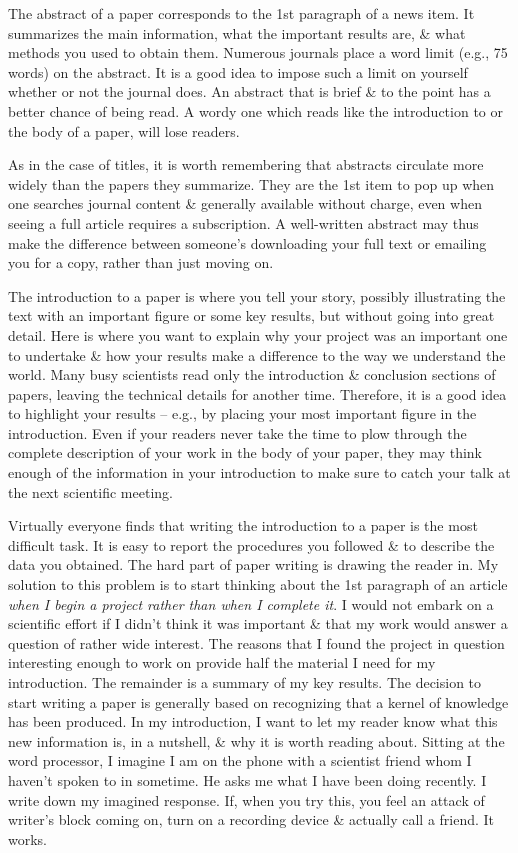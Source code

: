 \documentclass{article}
\begin{document}
\begin{enumerate}
\begin{itemize}
\begin{itemize}
			The abstract of a paper corresponds to the 1st paragraph of a news item. It summarizes the main information, what the important results are, \& what methods you used to obtain them. Numerous journals place a word limit (e.g., 75 words) on the abstract. It is a good idea to impose such a limit on yourself whether or not the journal does. An abstract that is brief \& to the point has a better chance of being read. A wordy one which reads like the introduction to or the body of a paper, will lose readers.
			
			As in the case of titles, it is worth remembering that abstracts circulate more widely than the papers they summarize. They are the 1st item to pop up when one searches journal content \& generally available without charge, even when seeing a full article requires a subscription. A well-written abstract may thus make the difference between someone's downloading your full text or emailing you for a copy, rather than just moving on.
			
			The introduction to a paper is where you tell your story, possibly illustrating the text with an important figure or some key results, but without going into great detail. Here is where you want to explain why your project was an important one to undertake \& how your results make a difference to the way we understand the world. Many busy scientists read only the introduction \& conclusion sections of papers, leaving the technical details for another time. Therefore, it is a good idea to highlight your results -- e.g., by placing your most important figure in the introduction. Even if your readers never take the time to plow through the complete description of your work in the body of your paper, they may think enough of the information in your introduction to make sure to catch your talk at the next scientific meeting.
			
			Virtually everyone finds that writing the introduction to a paper is the most difficult task. It is easy to report the procedures you followed \& to describe the data you obtained. The hard part of paper writing is drawing the reader in. My solution to this problem is to start thinking about the 1st paragraph of an article \textit{when I begin a project rather than when I complete it}. I would not embark on a scientific effort if I didn't think it was important \& that my work would answer a question of rather wide interest. The reasons that I found the project in question interesting enough to work on provide half the material I need for my introduction. The remainder is a summary of my key results. The decision to start writing a paper is generally based on recognizing that a kernel of knowledge has been produced. In my introduction, I want to let my reader know what this new information is, in a nutshell, \& why it is worth reading about. Sitting at the word processor, I imagine I am on the phone with a scientist friend whom I haven't spoken to in sometime. He asks me what I have been doing recently. I write down my imagined response. If, when you try this, you feel an attack of writer's block coming on, turn on a recording device \& actually call a friend. It works.
			

\end{itemize}
\end{itemize}
\end{enumerate}
\end{document}
